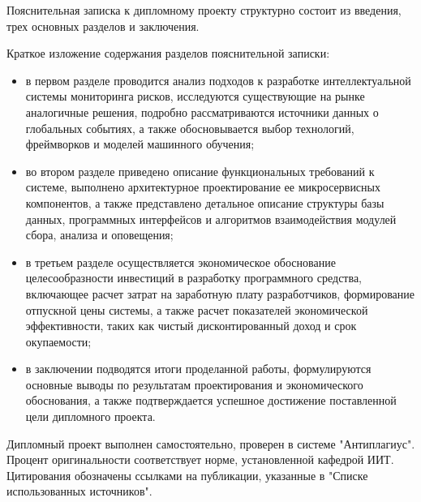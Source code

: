 Пояснительная записка к дипломному проекту структурно состоит из введения, трех основных разделов и заключения.

Краткое изложение содержания разделов пояснительной записки:
\begin{itemize}
\item в первом разделе проводится анализ подходов к разработке интеллектуальной системы мониторинга рисков, исследуются существующие на рынке аналогичные решения, подробно рассматриваются источники данных о глобальных событиях, а также обосновывается выбор технологий, фреймворков и моделей машинного обучения;
\item во втором разделе приведено описание функциональных требований к системе, выполнено архитектурное проектирование ее микросервисных компонентов, а также представлено детальное описание структуры базы данных, программных интерфейсов и алгоритмов взаимодействия модулей сбора, анализа и оповещения;
\item в третьем разделе осуществляется экономическое обоснование целесообразности инвестиций в разработку программного средства, включающее расчет затрат на заработную плату разработчиков, формирование отпускной цены системы, а также расчет показателей экономической эффективности, таких как чистый дисконтированный доход и срок окупаемости;
\item в заключении подводятся итоги проделанной работы, формулируются основные выводы по результатам проектирования и экономического обоснования, а также подтверждается успешное достижение поставленной цели дипломного проекта.
\end{itemize}

Дипломный проект выполнен самостоятельно, проверен в системе "Антиплагиус". Процент оригинальности соответствует норме, установленной кафедрой ИИТ. Цитирования обозначены ссылками на публикации, указанные в "Списке использованных источников".